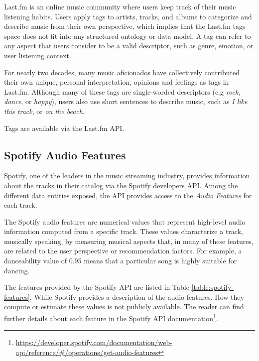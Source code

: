 \documentclass[sn-mathphys]{sn-jnl}%
\theoremstyle{thmstyleone}%
\theoremstyle{thmstyletwo}%
\theoremstyle{thmstylethree}%
\begin{document}
Last.fm is an online music community where users keep track of their music listening habits.
Users apply tags to artists, tracks, and albums to categorize and describe music from their own perspective, which
implies that the Last.fm tags space does not fit into any structured ontology or data model.
A tag can refer to any aspect that users consider to be a valid descriptor, such as genre,
emotion, or user listening context.

For nearly two decades, many music aficionados have collectively contributed their own unique, personal interpretation, opinions and feelings
as tags in Last.fm.
Although many of these tags are single-worded descriptors (e.g \emph{rock}, \emph{dance}, or \emph{happy}),
users also use short sentences to describe music, such as \emph{I like this track}, or \emph{on the beach}.

Tags are available via the Last.fm API.

\subsection{Spotify Audio Features}

Spotify, one of the leaders in the music streaming industry, provides information about the tracks in their catalog via the Spotify developers API.
Among the different data entities exposed, the API provides access to the \emph{Audio Features} for each track.

The Spotify audio features are numerical values that represent high-level audio information computed from a specific
track. These values characterize a track, musically speaking,
by measuring musical aspects that, in many of these features, are related to the user perspective or recommendation factors.
For example, a danceability value of 0.95 means
that a particular song is highly suitable for dancing.

The features provided by the Spotify API are listed in
Table \ref{table:spotify-features}.
While Spotify provides a description of the audio features.
How they compute or estimate these values is not publicly available.
The reader can find further details about each feature in the Spotify API documentation\footnote[5]{
      \url{https://developer.spotify.com/documentation/web-api/reference/\#/operations/get-audio-features}
}.
\end{document}
